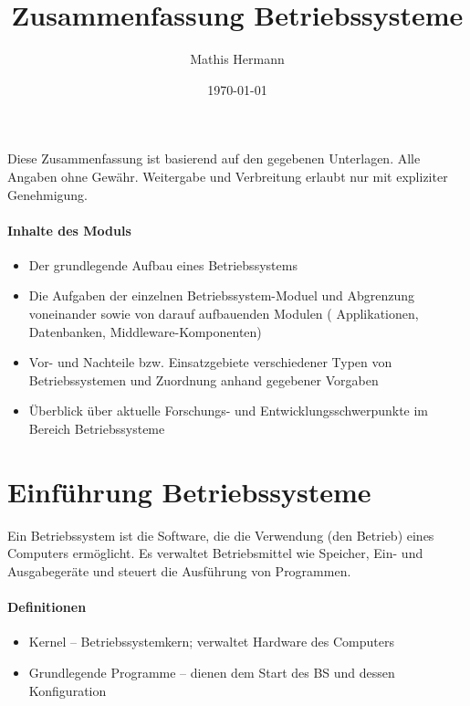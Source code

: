\documentclass[a4paper,12pt]{article}
\begin{document}
\title{Zusammenfassung Betriebssysteme}
\author{Mathis Hermann}
\date{\today}
\maketitle
Diese Zusammenfassung ist basierend auf den gegebenen Unterlagen. Alle Angaben ohne Gewähr. Weitergabe und Verbreitung erlaubt nur mit expliziter Genehmigung.

\paragraph{Inhalte des Moduls}
\begin{itemize}
\item Der grundlegende Aufbau eines Betriebssystems
\item Die Aufgaben der einzelnen Betriebssystem-Moduel und Abgrenzung voneinander sowie von darauf aufbauenden Modulen ( Applikationen, Datenbanken, Middleware-Komponenten)
\item Vor- und Nachteile bzw. Einsatzgebiete verschiedener Typen von Betriebssystemen und Zuordnung anhand gegebener Vorgaben
\item Überblick über aktuelle Forschungs- und Entwicklungsschwerpunkte im Bereich Betriebssysteme
\end{itemize}

\section{Einführung Betriebssysteme}
Ein Betriebssystem ist die Software, die die Verwendung (den Betrieb) eines Computers ermöglicht. Es verwaltet Betriebsmittel wie Speicher, Ein- und Ausgabegeräte und steuert die Ausführung von Programmen.

\paragraph{Definitionen}
\begin{itemize}
\item Kernel -- Betriebssystemkern; verwaltet Hardware des Computers
\item Grundlegende Programme -- dienen dem Start des BS und dessen Konfiguration
\end{itemize}
\end{document}
